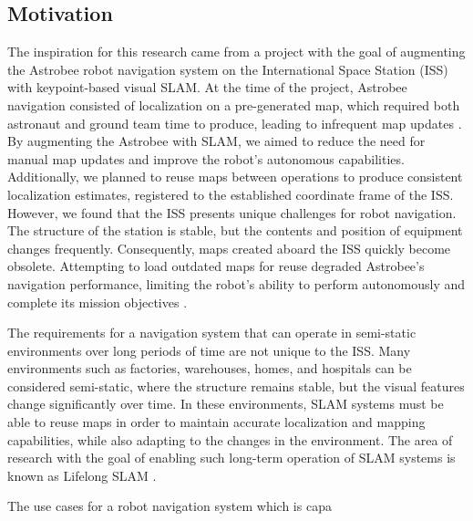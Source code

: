 \subsection{Motivation}


The inspiration for this research came from a project with the goal of augmenting the Astrobee robot navigation system on the International Space Station (ISS) with keypoint-based visual SLAM. At the time of the project, Astrobee navigation consisted of localization on a pre-generated map, which required both astronaut and ground team time to produce, leading to infrequent map updates \cite{soussanAstroLocEfficientRobust2022}. By augmenting the Astrobee with SLAM, we aimed to reduce the need for manual map updates and improve the robot's autonomous capabilities. Additionally, we planned to reuse maps between operations to produce consistent localization estimates, registered to the established coordinate frame of the ISS. However, we found that the ISS presents unique challenges for robot navigation. The structure of the station is stable, but the contents and position of equipment changes frequently. Consequently, maps created aboard the ISS quickly become obsolete. Attempting to load outdated maps for reuse degraded Astrobee's navigation performance, limiting the robot's ability to perform autonomously and complete its mission objectives \cite{zuralesCollaborativeSensingMapping2024}.


The requirements for a navigation system that can operate in semi-static environments over long periods of time are not unique to the ISS. Many environments such as factories, warehouses, homes, and hospitals can be considered semi-static, where the structure remains stable, but the visual features change significantly over time. In these environments, SLAM systems must be able to reuse maps in order to maintain accurate localization and mapping capabilities, while also adapting to the changes in the environment. The area of research with the goal of enabling such long-term operation of SLAM systems is known as Lifelong SLAM \cite{bujancaRobustSLAMSystems2021}.


The use cases for a robot navigation system which is capa